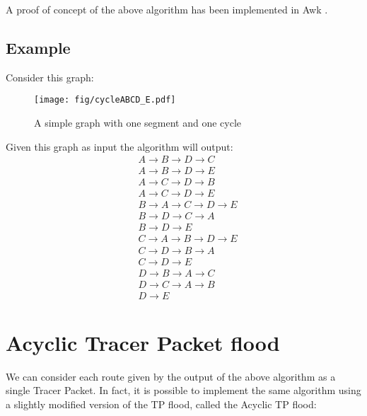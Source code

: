 \documentclass[a4paper]{article}
\begin{document}
A proof of concept of the above algorithm has been implemented in Awk
\cite{genrouteawk}.

\subsection*{Example}
Consider this graph:

\begin{figure}[h]
	\begin{center}
		\texttt{[image: fig/cycleABCD\_E.pdf]}
	\end{center}
	\caption{A simple graph with one segment and one cycle}
	\label{fig:gen_route_sample}
\end{figure}

Given this graph as input the algorithm will output:
\label{sec:genroute_output}
\begin{align*}
& A \rightarrow B \rightarrow D \rightarrow C\\
& A \rightarrow B \rightarrow D \rightarrow E\\
& A \rightarrow C \rightarrow D \rightarrow B\\
& A \rightarrow C \rightarrow D \rightarrow E\\
& B \rightarrow A \rightarrow C \rightarrow D \rightarrow E\\
& B \rightarrow D \rightarrow C \rightarrow A\\
& B \rightarrow D \rightarrow E\\
& C \rightarrow A \rightarrow B \rightarrow D \rightarrow E\\
& C \rightarrow D \rightarrow B \rightarrow A\\
& C \rightarrow D \rightarrow E\\
& D \rightarrow B \rightarrow A \rightarrow C\\
& D \rightarrow C \rightarrow A \rightarrow B\\
& D \rightarrow E
\end{align*}

\section{Acyclic Tracer Packet flood}
\label{sec:acyclic_TP_flood}

We can consider each route given by the output of the above algorithm as a
single Tracer Packet.
In fact, it is possible to implement the same algorithm using a slightly
modified version of the TP flood, called the Acyclic TP flood:
\end{document}
